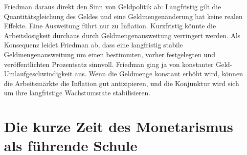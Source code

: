 Friedman daraus direkt den Sinn von Geldpolitik ab: Langfristig gilt die Quantitätsgleichung des Geldes und eine Geldmengenänderung hat keine realen Effekte. Eine Ausweitung führt nur zu Inflation. Kurzfristig könnte die Arbeitslosigkeit durchaus durch Geldmengenausweitung verringert werden. Als Konsequenz leidet Friedman ab, dass eine langfristig stabile Geldmengenausweitung um einen bestimmten, vorher festgelegten und veröffentlichten Prozentsatz sinnvoll. Friedman ging ja von konstanter Geld-Umlaufgeschwindigkeit aus. Wenn die Geldmenge konstant erhöht wird, können die Arbeitsmärkte die Inflation gut antizipieren, und die Konjunktur wird sich um ihre langfristige Wachstumsrate stabilisieren. 


\section{Die kurze Zeit des Monetarismus als führende Schule}

